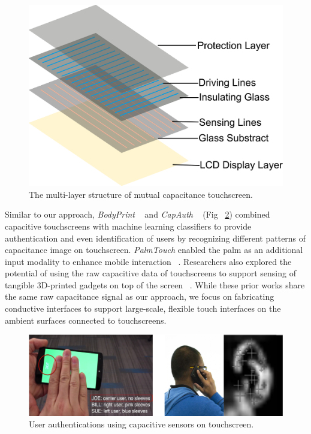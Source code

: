 \begin{figure}[ht]
    \centering
	\includegraphics[width=0.78\columnwidth]{figures/multi-layer-touchscreen.png}
	\setlength{\belowcaptionskip}{-6pt}
    \caption{The multi-layer structure of mutual capacitance touchscreen. }
    \label{fig:multi-layer-touchscreen}
\end{figure}

Similar to our approach, \textit{BodyPrint} ~\cite{Holz-bodyprint} and \textit{CapAuth} ~\cite{Guo2015} (Fig ~\ref{fig:capacitive-auth}) combined capacitive touchscreens with machine learning classifiers to provide authentication and even identification of users by recognizing different patterns of capacitance image on touchscreen. \textit{PalmTouch} enabled the palm as an additional input modality to enhance mobile interaction ~\cite{Le-palmtouch}. Researchers also explored the potential of using the raw capacitive data of touchscreens to support sensing of tangible 3D-printed gadgets on top of the screen ~\cite{Chan-CapStones, Schmitz2017, Schmitz2018}. While these prior works share the same raw capacitance signal as our approach, we focus on fabricating conductive interfaces to support large-scale, flexible touch interfaces on the ambient surfaces connected to touchscreens.

\begin{figure}[ht]
    \centering
	\includegraphics[width=0.88\columnwidth]{figures/capacitive-auth.png}
	\setlength{\belowcaptionskip}{-6pt}
    \caption{User authentications using capacitive sensors on touchscreen.}
    \label{fig:capacitive-auth}
\end{figure}

